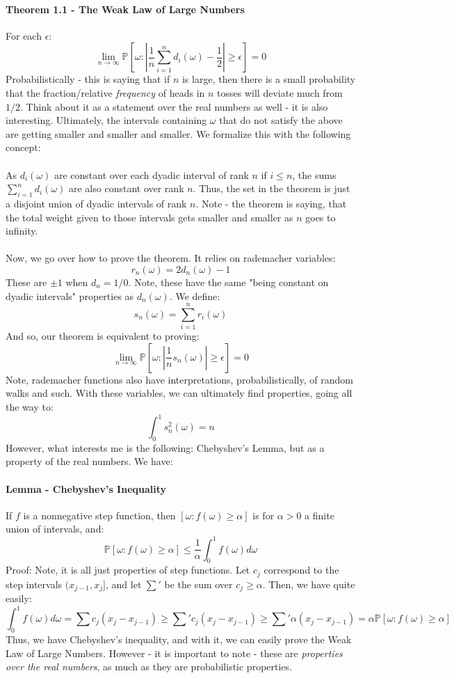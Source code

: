 \documentclass[12pt,a4paper]{article}
\newcommand{\1}[1]{\mathbbm{1}\left\{ #1 \right\}}
\newcommand{\Prob}{\mathbb{P}}
\begin{document}
\paragraph{Theorem 1.1 - The Weak Law of Large Numbers} For each $\epsilon$:
$$
	\lim_{n \to \infty} \Prob\left[
	\omega: \left|\frac{1}{n}\sum_{i=1}^n d_i(\omega) - \frac{1}{2}\right| \geq \epsilon
	\right] = 0
$$
Probabilistically - this is saying that if $n$ is large, then there is a small probability that the fraction/relative \textit{frequency} of heads in $n$ tosses will deviate much from $1/2$. Think about it as a statement over the real numbers as well - it is also interesting. Ultimately, the intervals containing $\omega$ that do not satisfy the above are getting smaller and smaller and smaller. We formalize this with the following concept:
\\\\
As $d_i(\omega)$ are constant over each dyadic interval of rank $n$ if $i \leq n$, the sums $\sum_{i=1}^n d_i(\omega)$ are also constant over rank $n$. Thus, the set in the theorem is just a disjoint union of dyadic intervals of rank $n$. Note - the theorem is saying, that the total weight given to those intervals gets smaller and smaller as $n$ goes to infinity.
\\\\
Now, we go over how to prove the theorem. It relies on rademacher variables:
$$
	r_n(\omega) = 2d_n(\omega) - 1
$$
These are $\pm 1$ when $d_n = 1/0$. Note, these have the same "being constant on dyadic intervals" properties as $d_n(\omega)$. We define:
$$
	s_n(\omega) = \sum_{i=1}^n r_i(\omega)
$$
And so, our theorem is equivalent to proving:
$$
	\lim_{n \to \infty} \Prob\left[
	\omega: \left|\frac{1}{n} s_n(\omega)\right| \geq \epsilon
	\right] = 0
$$
Note, rademacher functions also have interpretations, probabilistically, of random walks and such. With these variables, we can ultimately find properties, going all the way to:
$$
	\int_0^1 s_n^2(\omega) = n
$$
However, what interests me is the following: Chebyshev's Lemma, but as a property of the real numbers. We have:

\paragraph{Lemma - Chebyshev's Inequality} If $f$ is a nonnegative step function, then $[\omega: f(\omega) \geq \alpha]$ is for $\alpha > 0$ a finite union of intervals, and:
$$
	\Prob\left[\omega: f(\omega) \geq \alpha\right] \leq \frac{1}{\alpha} \int_0^1 f(\omega) d\omega
$$
Proof: Note, it is all just properties of step functions. Let $c_j$ correspond to the step intervals $(x_{j-1},x_j]$, and let $\sum'$ be the sum over $c_j \geq \alpha$. Then, we have quite easily:
$$
	\int_0^1 f(\omega) d\omega =
	\sum c_j (x_j - x_{j-1}) \geq 
	\sum' c_j (x_j - x_{j-1}) \geq 
	\sum' \alpha (x_j - x_{j-1}) = \alpha \Prob\left[\omega: f(\omega) \geq \alpha\right]
$$ 
Thus, we have Chebyshev's inequality, and with it, we can easily prove the Weak Law of Large Numbers. However - it is important to note - these are \textit{properties over the real numbers}, as much as they are probabilistic properties.
\end{document}
